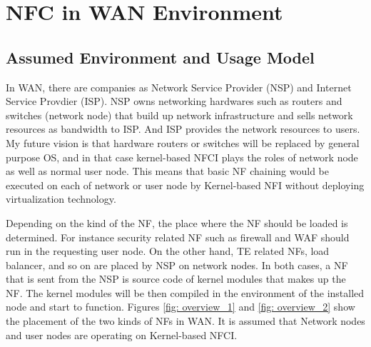 \section{NFC in WAN Environment} 
\subsection{Assumed Environment and Usage Model}
In WAN, there are companies as Network Service Provider (NSP) and Internet Service Provdier (ISP). NSP owns networking hardwares such as routers and switches (network node) that build up network infrastructure and sells network resources as bandwidth to ISP. And ISP provides the network resources to users. My future vision is that hardware routers or switches will be replaced by general purpose OS, and in that case kernel-based NFCI plays the roles of network node as well as normal user node. This means that basic NF chaining would be executed on each of network or user node by Kernel-based NFI without deploying virtualization technology. 

Depending on the kind of the NF, the place where the NF should be loaded is determined. For instance security related NF such as firewall and  WAF should run in the requesting user node. On the other hand, TE related NFs, load balancer, and so on are placed by NSP on network nodes. In both cases, a NF that is sent from the NSP is source code of kernel modules that makes up the NF. The kernel modules will be then compiled in the environment of the installed node and start to function. Figures \ref{fig: overview_1} and \ref{fig: overview_2} show the placement of the two kinds of NFs in WAN. It is assumed that Network nodes and user nodes are operating on Kernel-based NFCI. 

